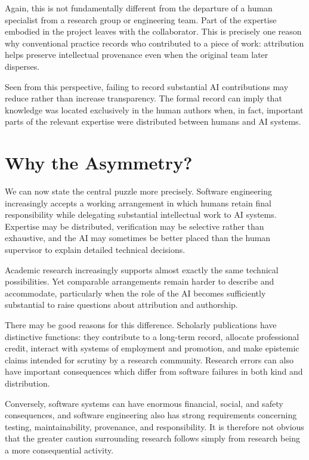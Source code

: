 Again, this is not fundamentally different from the departure of a human specialist from a research group or engineering team. Part of the expertise embodied in the project leaves with the collaborator. This is precisely one reason why conventional practice records who contributed to a piece of work: attribution helps preserve intellectual provenance even when the original team later disperses.

Seen from this perspective, failing to record substantial AI contributions may reduce rather than increase transparency. The formal record can imply that knowledge was located exclusively in the human authors when, in fact, important parts of the relevant expertise were distributed between humans and AI systems.


\section{Why the Asymmetry?}

We can now state the central puzzle more precisely. Software engineering increasingly accepts a working arrangement in which humans retain final responsibility while delegating substantial intellectual work to AI systems. Expertise may be distributed, verification may be selective rather than exhaustive, and the AI may sometimes be better placed than the human supervisor to explain detailed technical decisions.

Academic research increasingly supports almost exactly the same technical possibilities. Yet comparable arrangements remain harder to describe and accommodate, particularly when the role of the AI becomes sufficiently substantial to raise questions about attribution and authorship.

There may be good reasons for this difference. Scholarly publications have distinctive functions: they contribute to a long-term record, allocate professional credit, interact with systems of employment and promotion, and make epistemic claims intended for scrutiny by a research community. Research errors can also have important consequences which differ from software failures in both kind and distribution.

Conversely, software systems can have enormous financial, social, and safety consequences, and software engineering also has strong requirements concerning testing, maintainability, provenance, and responsibility. It is therefore not obvious that the greater caution surrounding research follows simply from research being a more consequential activity.

